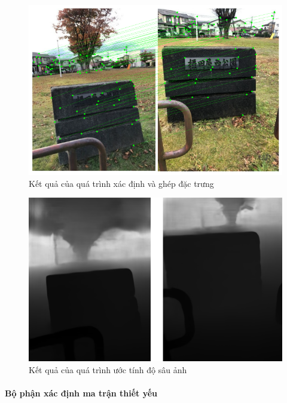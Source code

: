 \begin{figure}[H]
    \centering
    \includegraphics[scale=0.7]{pics/Proposal/matching.png}
    \caption{Kết quả của quá trình xác định và ghép đặc trưng}
\end{figure}

\begin{figure}[H]
    \centering
    \includegraphics[scale=0.6]{pics/Proposal/depth.png}
    \caption{Kết quả của quá trình ước tính độ sâu ảnh}
\end{figure}

\paragraph*{Bộ phận xác định ma trận thiết yếu}

